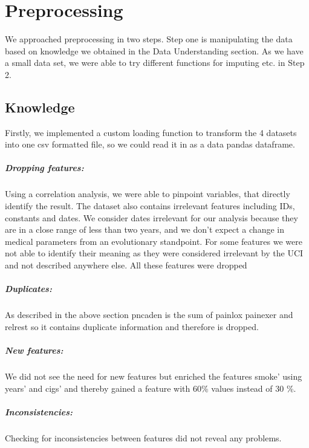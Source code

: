 \chapter{Preprocessing}
We approached preprocessing in two steps. Step one is manipulating the data based on knowledge we obtained in the Data Understanding section. 
As we have a small data set, we were able to try different functions for imputing etc. in Step 2.


\section{Knowledge}
Firstly, we implemented a custom loading function to transform the 4 datasets into one csv formatted file, so we could read it in as a data pandas dataframe.

\paragraph{Dropping features:}
Using a correlation analysis, we were able to pinpoint variables, that directly identify the result. 
The dataset also contains irrelevant features including IDs, constants and dates. We consider dates irrelevant for our analysis because they are in a close range of less than two years, and we don’t expect a change in medical parameters from an evolutionary standpoint.
For some features we were not able to identify their meaning as they were considered irrelevant by the UCI  and not described anywhere else.
All these features were dropped

\paragraph{Duplicates:}
As described in the above section pncaden is the sum of painlox painexer and relrest so it contains duplicate information and therefore is dropped.

\paragraph{New features:}
We did not see the need for new features but enriched the features smoke’ using years’ and cigs’ and thereby gained a feature with 60\% values instead of 30 \%. 

\paragraph{Inconsistencies:}
Checking for inconsistencies between features did not reveal any problems.

